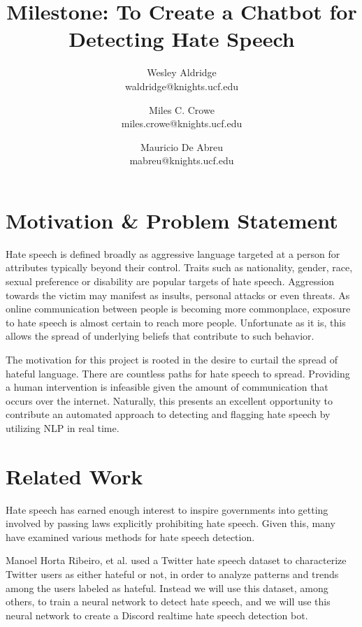 \documentclass[conference]{sig-alternate-05-2015}
\begin{document}
\title{Milestone: To Create a Chatbot for Detecting Hate Speech}

\author{Wesley Aldridge\\ waldridge@knights.ucf.edu \and Miles C. Crowe  \\ miles.crowe@knights.ucf.edu \and Mauricio De Abreu\\ mabreu@knights.ucf.edu}

\maketitle

\section{Motivation \& Problem Statement}\label{sec:motivation}
Hate speech is defined broadly as aggressive language targeted at a person for attributes typically beyond their control.  Traits such as nationality, gender, race, sexual preference or disability are popular targets of hate speech\cite{Dictionary.com}.  Aggression towards the victim may manifest as insults, personal attacks or even threats.  As online communication between people is becoming more commonplace, exposure to hate speech is almost certain to reach more people.  Unfortunate as it is, this allows the spread of underlying beliefs that contribute to such behavior.

The motivation for this project is rooted in the desire to curtail the spread of hateful language.  There are countless paths for hate speech to spread.  Providing a human intervention is infeasible given the amount of communication  that occurs over the internet.  Naturally, this presents an excellent opportunity to contribute an automated approach to detecting and flagging hate speech by utilizing NLP in real time.

\section{Related Work}\label{sec:related}

Hate speech has earned enough interest to inspire governments into getting involved\cite{Davidsonetal.} by passing laws explicitly prohibiting hate speech.  Given this, many have examined various methods for hate speech detection.

Manoel Horta Ribeiro, et al.\cite{HatefulUsersTwitter}\cite{ribeiro2017like} used a Twitter hate speech dataset to characterize Twitter users as either hateful or not, in order to analyze patterns and trends among the users labeled as hateful. Instead we will use this dataset, among others, to train a neural network to detect hate speech, and we will use this neural network to create a Discord realtime hate speech detection bot.
\end{document}
